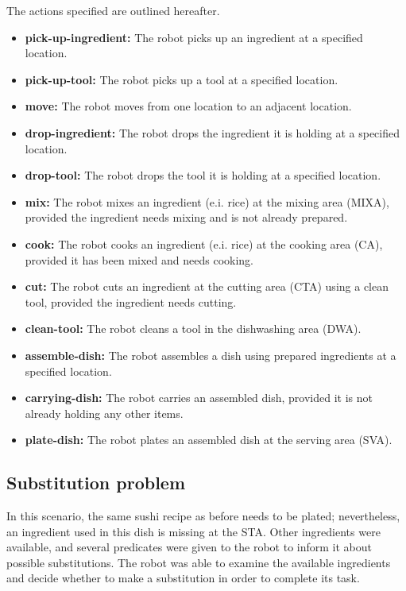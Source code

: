 The actions specified are outlined hereafter.
\begin{itemize}
    \item \textbf{pick-up-ingredient:} The robot picks up an ingredient at a specified location.
    \item \textbf{pick-up-tool:} The robot picks up a tool at a specified location.
    \item \textbf{move:} The robot moves from one location to an adjacent location.
    \item \textbf{drop-ingredient:} The robot drops the ingredient it is holding at a specified location.
    \item \textbf{drop-tool:} The robot drops the tool it is holding at a specified location.
    \item \textbf{mix:} The robot mixes an ingredient (e.i. rice) at the mixing area (MIXA), provided the ingredient needs mixing and is not already prepared.
    \item \textbf{cook:} The robot cooks an ingredient (e.i. rice) at the cooking area (CA), provided it has been mixed and needs cooking.
    \item \textbf{cut:} The robot cuts an ingredient at the cutting area (CTA) using a clean tool, provided the ingredient needs cutting.
    \item \textbf{clean-tool:} The robot cleans a tool in the dishwashing area (DWA).
    \item \textbf{assemble-dish:} The robot assembles a dish using prepared ingredients at a specified location.
    \item \textbf{carrying-dish:} The robot carries an assembled dish, provided it is not already holding any other items.
    \item \textbf{plate-dish:} The robot plates an assembled dish at the serving area (SVA).
\end{itemize}

\subsection{Substitution problem}
In this scenario, the same sushi recipe as before needs to be plated; nevertheless, an ingredient used in this dish is missing at the 
STA. Other ingredients were available, and several predicates were given to the robot to inform it about possible substitutions. 
The robot was able to examine the available ingredients and decide whether to make a substitution in order to complete its task. 

